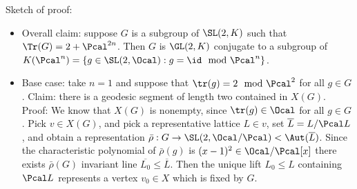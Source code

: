 Sketch of proof:
\begin{itemize}
	\item Overall claim: suppose $G$ is a subgroup of $\SL(2,K)$ such that $\Tr(G) = 2 + \Pcal^{2n}$. Then $G$ is $\GL(2,K)$ conjugate to a subgroup of $K(\Pcal^n) = \{ g \in \SL(2,\Ocal) : g = \id \mod \Pcal^{n}\}$.
	\item Base case: take $n=1$ and suppose that $\tr(g) = 2 \mod \Pcal^{2}$ for all $g\in G$.
	      \subitem Claim: there is a geodesic segment of length two contained in $X(G)$.
	      \subitem Proof: We know that $X(G)$ is nonempty, since $\tr(g) \in \Ocal$ for all $g\in G$. Pick $v \in X(G)$, and pick a representative lattice $L \in v$,  set $\overline{L} = L / \Pcal L$, and  obtain a representation $\bar{\rho}: G \to \SL(2,\Ocal/\Pcal) < \Aut(\overline{L})$. Since the characteristic polynomial of $\bar{\rho}(g)$ is $(x-1)^2 \in \Ocal /\Pcal [x]$ there exists $\bar{\rho}(G)$ invariant line $\overline{L_0} \leq \overline{L}$. Then the unique lift $L_0 \leq L$ containing $\Pcal L$ represents a vertex $v_0 \in X$ which is fixed by $G$.
\end{itemize}


















